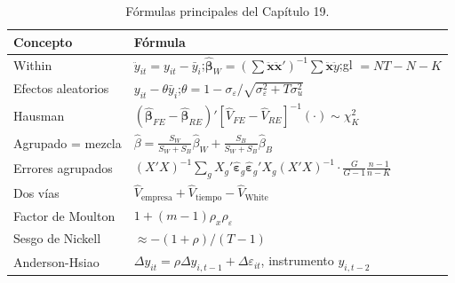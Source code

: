 \begin{table}[H]
\centering\small
\begin{tabular}{@{}ll@{}}
\toprule
Concepto & Fórmula \\
\midrule
Within & $\ddot y_{it}=y_{it}-\bar y_i$;\quad $\hat{\boldsymbol\beta}_W=(\sum\ddot{\mathbf x}\ddot{\mathbf x}')^{-1}\sum\ddot{\mathbf x}\ddot y$;\quad gl $=NT-N-K$ \\
Efectos aleatorios & $y_{it}-\theta\bar y_i$;\quad $\theta=1-\sigma_\varepsilon/\sqrt{\sigma_\varepsilon^2+T\sigma_u^2}$ \\
Hausman & $(\hat{\boldsymbol\beta}_{FE}-\hat{\boldsymbol\beta}_{RE})'[\hat V_{FE}-\hat V_{RE}]^{-1}(\cdot)\sim\chi^2_K$ \\
Agrupado = mezcla & $\hat\beta=\frac{S_W}{S_W+S_B}\hat\beta_W+\frac{S_B}{S_W+S_B}\hat\beta_B$ \\
Errores agrupados & $(X'X)^{-1}\sum_gX_g'\hat{\boldsymbol\varepsilon}_g\hat{\boldsymbol\varepsilon}_g'X_g(X'X)^{-1}\cdot\frac{G}{G-1}\frac{n-1}{n-K}$ \\
Dos vías & $\hat V_{\text{empresa}}+\hat V_{\text{tiempo}}-\hat V_{\text{White}}$ \\
Factor de Moulton & $1+(m-1)\rho_x\rho_\varepsilon$ \\
Sesgo de Nickell & $\approx-(1+\rho)/(T-1)$ \\
Anderson-Hsiao & $\Delta y_{it}=\rho\Delta y_{i,t-1}+\Delta\varepsilon_{it}$, instrumento $y_{i,t-2}$ \\
\bottomrule
\end{tabular}
\caption{Fórmulas principales del Capítulo 19.}
\end{table}

